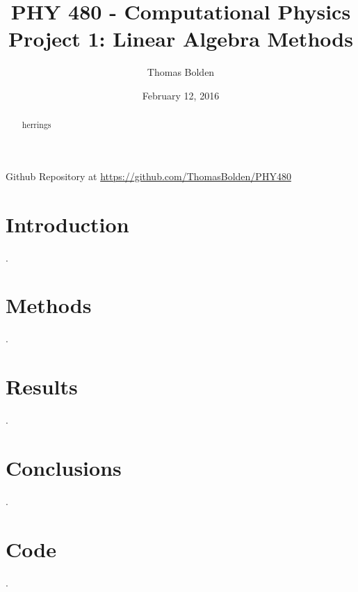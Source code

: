 \documentclass[11pt]{article}
\title{PHY 480 - Computational Physics \\ Project 1: Linear Algebra Methods}
\author{Thomas Bolden}
\date{February 12, 2016}
\begin{document}
\maketitle

\centerline{Github Repository at \href{https://github.com/ThomasBolden/PHY480}{https://github.com/ThomasBolden/PHY480}}

\begin{abstract}

    herrings

\end{abstract}

\tableofcontents

\pagebreak

\section{Introduction}

    .

\section{Methods}

    .

\section{Results}

    .

\section{Conclusions}

    .

\section{Code}

    .

\begin{thebibliography}{1}


\end{thebibliography}
\end{document}
